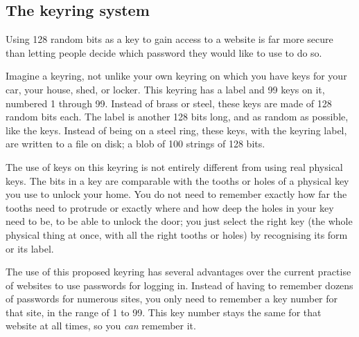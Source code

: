 \subsection{The keyring system}
Using 128 random bits as a key to gain access to a website is far more secure than letting people decide which password they would like to use to do so.
\par
Imagine a keyring, not unlike your own keyring on which you have keys for your car, your house, shed, or locker.
This keyring has a label and 99 keys on it, numbered 1 through 99.
Instead of brass or steel, these keys are made of 128 random bits each.
The label is another 128 bits long, and as random as possible, like the keys.
Instead of being on a steel ring, these keys, with the keyring label, are written to a file on disk; a blob of 100 strings of 128 bits.
\par
The use of keys on this keyring is not entirely different from using real physical keys.
The bits in a key are comparable with the tooths or holes of a physical key you use to unlock your home.
You do not need to remember exactly how far the tooths need to protrude or exactly where and how deep the holes in your key need to be, to be able to unlock the door;
you just select the right key
(the whole physical thing at once, with all the right tooths or holes)
by recognising its form or its label.
\par
The use of this proposed keyring has several advantages over the current practise of websites to use passwords for logging in.
Instead of having to remember dozens of passwords for numerous sites,
you only need to remember a key number for that site, in the range of 1 to 99.
This key number stays the same for that website at all times, so you \emph{can} remember it.

